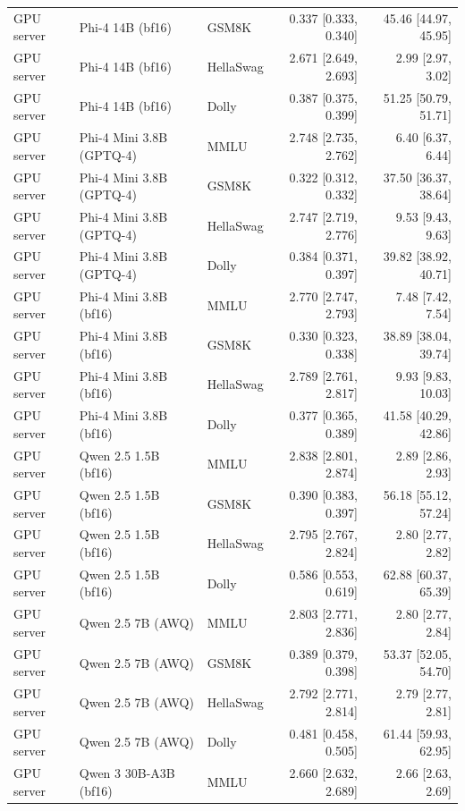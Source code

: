 \begin{longtable}{@{}l l l r r@{}}
GPU server & Phi-4 14B (bf16) & GSM8K & 0.337 [0.333, 0.340] & 45.46 [44.97, 45.95] \\
GPU server & Phi-4 14B (bf16) & HellaSwag & 2.671 [2.649, 2.693] & 2.99 [2.97, 3.02] \\
GPU server & Phi-4 14B (bf16) & Dolly & 0.387 [0.375, 0.399] & 51.25 [50.79, 51.71] \\
GPU server & Phi-4 Mini 3.8B (GPTQ-4) & MMLU & 2.748 [2.735, 2.762] & 6.40 [6.37, 6.44] \\
GPU server & Phi-4 Mini 3.8B (GPTQ-4) & GSM8K & 0.322 [0.312, 0.332] & 37.50 [36.37, 38.64] \\
GPU server & Phi-4 Mini 3.8B (GPTQ-4) & HellaSwag & 2.747 [2.719, 2.776] & 9.53 [9.43, 9.63] \\
GPU server & Phi-4 Mini 3.8B (GPTQ-4) & Dolly & 0.384 [0.371, 0.397] & 39.82 [38.92, 40.71] \\
GPU server & Phi-4 Mini 3.8B (bf16) & MMLU & 2.770 [2.747, 2.793] & 7.48 [7.42, 7.54] \\
GPU server & Phi-4 Mini 3.8B (bf16) & GSM8K & 0.330 [0.323, 0.338] & 38.89 [38.04, 39.74] \\
GPU server & Phi-4 Mini 3.8B (bf16) & HellaSwag & 2.789 [2.761, 2.817] & 9.93 [9.83, 10.03] \\
GPU server & Phi-4 Mini 3.8B (bf16) & Dolly & 0.377 [0.365, 0.389] & 41.58 [40.29, 42.86] \\
GPU server & Qwen 2.5 1.5B (bf16) & MMLU & 2.838 [2.801, 2.874] & 2.89 [2.86, 2.93] \\
GPU server & Qwen 2.5 1.5B (bf16) & GSM8K & 0.390 [0.383, 0.397] & 56.18 [55.12, 57.24] \\
GPU server & Qwen 2.5 1.5B (bf16) & HellaSwag & 2.795 [2.767, 2.824] & 2.80 [2.77, 2.82] \\
GPU server & Qwen 2.5 1.5B (bf16) & Dolly & 0.586 [0.553, 0.619] & 62.88 [60.37, 65.39] \\
GPU server & Qwen 2.5 7B (AWQ) & MMLU & 2.803 [2.771, 2.836] & 2.80 [2.77, 2.84] \\
GPU server & Qwen 2.5 7B (AWQ) & GSM8K & 0.389 [0.379, 0.398] & 53.37 [52.05, 54.70] \\
GPU server & Qwen 2.5 7B (AWQ) & HellaSwag & 2.792 [2.771, 2.814] & 2.79 [2.77, 2.81] \\
GPU server & Qwen 2.5 7B (AWQ) & Dolly & 0.481 [0.458, 0.505] & 61.44 [59.93, 62.95] \\
GPU server & Qwen 3 30B-A3B (bf16) & MMLU & 2.660 [2.632, 2.689] & 2.66 [2.63, 2.69] \\

\end{longtable}
